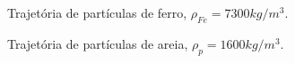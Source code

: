 \documentclass{beamer}
\begin{document}
\begin{frame}
  \begin{minipage}{.48\textwidth}
    \begin{figure}
       {\raggedleft \tiny Trajetória de partículas de ferro, $\rho_{Fe}=7300kg/m^3$.}
    \end{figure}
  \end{minipage}
  \hfill
  \begin{minipage}{.48\textwidth}
    \begin{figure}
       {\raggedleft \tiny Trajetória de partículas de areia, $\rho_p=1600kg/m^3$.}
    \end{figure}
  \end{minipage}
\end{frame}

\end{document}
